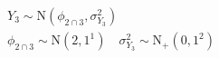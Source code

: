 \begin{equation}
\begin{gathered}
  Y_{3} \sim \text{N}(\phi_{2 \cap 3}, \sigma^{2}_{Y_{3}}) \\
  \phi_{2 \cap 3} \sim \text{N}(2, 1^1) \quad
  \sigma^{2}_{Y_{3}} \sim \text{N}_{+}(0, 1^2)
  \label{eqn:model-3-specification}  
\end{gathered}
\end{equation}